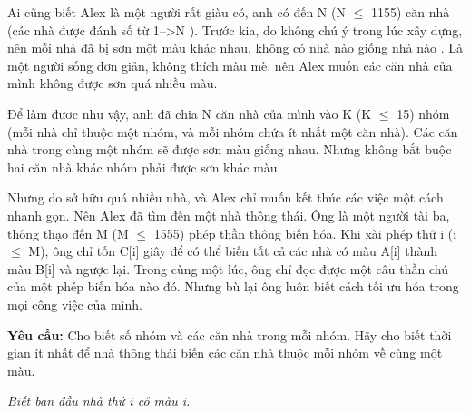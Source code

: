 Ai cũng biết Alex là một người rất giàu có, anh có đến   N (N $\le$ 1155)   căn nhà (các nhà được đánh số từ   1-->N   ). Trước kia, do không chú ý trong lúc xây dựng,   nên mỗi nhà đã bị sơn một màu khác nhau,   không có nhà nào giống nhà nào . Là một người sống đơn giản, không thích màu mè, nên Alex muốn các căn nhà của mình không được sơn quá nhiều màu.  

   Để làm đươc như vậy, anh đã chia   N   căn nhà của mình vào   \textbf{}K (K $\le$ 15)   nhóm (mỗi nhà chỉ thuộc một nhóm, và mỗi nhóm chứa ít nhất một căn nhà).   Các căn nhà trong cùng một nhóm sẽ được sơn màu giống nhau.   Nhưng không bắt buộc hai căn nhà khác nhóm phải được sơn khác màu.   \emph{
\\}

   Nhưng do sở hữu quá nhiều nhà, và Alex chỉ muốn kết thúc các việc một cách nhanh gọn. Nên Alex đã tìm đến một nhà thông thái. Ông là một người tài ba, thông thạo đến   M (M $\le$ 1555)   phép thần thông biến hóa. Khi xài phép thứ i (i $\le$ M), ông chỉ tốn C[i] giây để có thể   biến tất cả các nhà có màu A[i] thành màu B[i] và ngược lại.   Trong cùng một lúc, ông chỉ đọc được một câu thần chú của một phép biến hóa nào đó.      Nhưng bù lại ông luôn biết cách tối ưu hóa trong mọi công việc của mình.   \emph{
\\}

\textbf{    Yêu cầu:   }   Cho biết số nhóm và các căn nhà trong mỗi nhóm. Hãy cho biết thời gian ít nhất để nhà thông thái biến các căn nhà thuộc mỗi nhóm về cùng một màu.  

\emph{    Biết ban đầu nhà thứ i có màu i.    
\\}